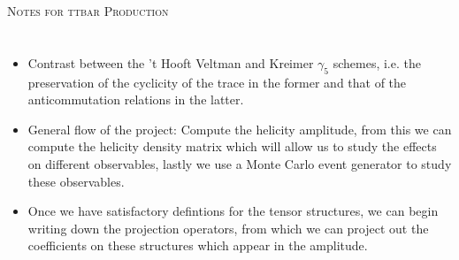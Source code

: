 \documentclass[12pt]{article}
\numberwithin{equation}{section}
\numberwithin{figure}{section}
\numberwithin{table}{section}
\begin{document}
	\begin{center}
		{\Huge \scshape Notes for ttbar Production}
	\end{center}

	\vspace{0.5cm}
	
	\section{}

        \begin{itemize}
        \item Contrast between the 't Hooft Veltman and Kreimer \(\gamma_5\) schemes, i.e. the preservation of the cyclicity of the trace in the former and that of the anticommutation relations in the latter.
        \item General flow of the project: Compute the helicity amplitude, from this we can compute the helicity density matrix which will allow us to study the effects on different observables, lastly we use a Monte Carlo event generator to study these observables.
        \item Once we have satisfactory defintions for the tensor structures, we can begin writing down the projection operators, from which we can project out the coefficients on these structures which appear in the amplitude. 
        \end{itemize}
\end{document}
